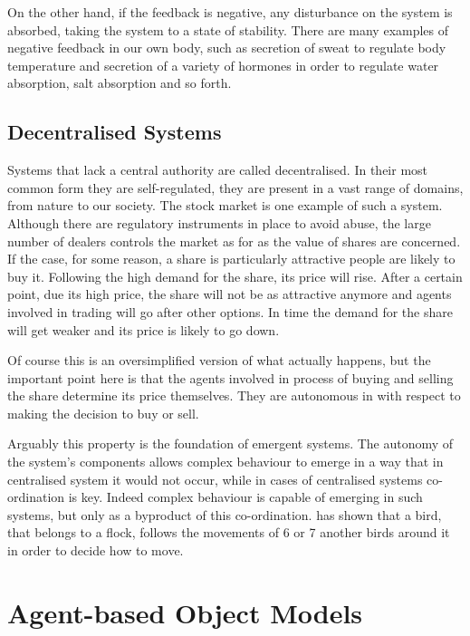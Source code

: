 On the other hand, if the feedback is negative, any disturbance on the system is absorbed, taking the system to a state of stability. There are many examples of negative feedback in our own body, such as secretion of sweat to regulate body temperature and secretion of a variety of hormones in order to regulate water absorption, salt absorption and so forth.  

\subsection{Decentralised Systems}

Systems that lack a central authority are called decentralised. In their most common form they are self-regulated, they are present in a vast range of domains, from nature to our society. The stock market is one example of such a system. Although there are regulatory instruments in place to avoid abuse, the large number of dealers controls the market as for as the value of shares are concerned. If the case, for some reason, a share is particularly attractive people are likely to buy it. Following the high demand for the share, its price will rise. After a certain point, due its high price, the share will not be as attractive anymore and agents involved in trading will go after other options. In  time the demand for the share will get weaker and its price is likely to go down.

Of course this is an oversimplified version of what actually happens, but the important point here is that the agents involved in process of buying and selling the share determine its price themselves. They are autonomous in with respect to making the decision to buy or sell.

Arguably this property is the foundation of emergent systems. The autonomy of the system's components allows complex behaviour to emerge in a way that in centralised system it would not occur, while in cases of centralised systems co-ordination is key. Indeed complex behaviour is capable of emerging in such systems, but only as a byproduct of this co-ordination. \citeauthor{ballerini2008interaction} \cite{ballerini2008interaction} has shown that a bird, that belongs to a flock, follows the movements of 6 or 7 another birds around it in order to decide how to move.

\section{Agent-based Object Models}

